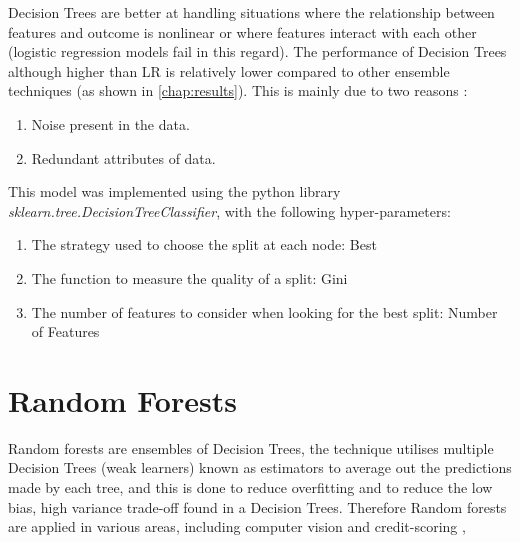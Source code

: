 


Decision Trees are better at handling situations where the relationship between features and outcome is nonlinear or where features interact with each other (logistic regression models fail in this regard). The performance of Decision Trees although higher than LR is relatively lower compared to other ensemble techniques (as shown in \autoref{chap:results}). 
This is mainly due to two reasons \cite{dietterich2000experimental}:

\begin{enumerate}
    \item Noise present in the data.
    \item Redundant attributes of data.
\end{enumerate}

This model was implemented using the python library \textit{sklearn.tree.DecisionTreeClassifier}, with the following hyper-parameters:

\begin{enumerate}
    \item The strategy used to choose the split at each node: Best
    \item The function to measure the quality of a split: Gini
    \item The number of features to consider when looking for the best split: Number of Features

\end{enumerate}



\section{Random Forests}

Random forests are ensembles of Decision Trees, the technique utilises multiple Decision Trees (weak learners) known as estimators to average out the predictions made by each tree, and this is done to reduce overfitting and to reduce the low bias, high variance trade-off found in a Decision Trees. Therefore Random forests are applied in various areas, including computer vision \cite{bosch2007image} and credit-scoring \cite{brown2012experimental},  

